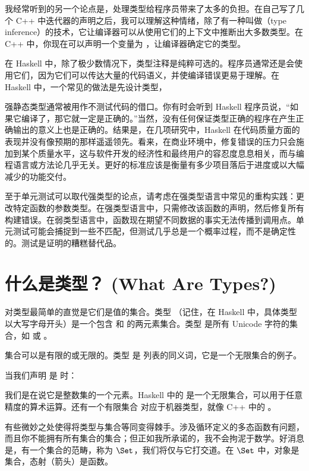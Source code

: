 我经常听到的另一个论点是，处理类型给程序员带来了太多的负担。在自己写了几个 C++ 中迭代器的声明之后，我可以理解这种情绪，除了有一种叫做（type inference）的技术，它让编译器可以从使用它们的上下文中推断出大多数类型。在 C++ 中，你现在可以声明一个变量为 ，让编译器确定它的类型。

在 Haskell 中，除了极少数情况下，类型注释是纯粹可选的。程序员通常还是会使用它们，因为它们可以传达大量的代码语义，并使编译错误更易于理解。在 Haskell 中，一个常见的做法是先设计类型，

强静态类型通常被用作不测试代码的借口。你有时会听到 Haskell 程序员说，“如果它编译了，那它就一定是正确的。”当然，没有任何保证类型正确的程序在产生正确输出的意义上也是正确的。结果是，在几项研究中，Haskell 在代码质量方面的表现并没有像预期的那样遥遥领先。看来，在商业环境中，修复错误的压力只会施加到某个质量水平，这与软件开发的经济性和最终用户的容忍度息息相关，而与编程语言或方法论几乎无关。更好的标准应该是衡量有多少项目落后于进度或以大幅减少的功能交付。

至于单元测试可以取代强类型的论点，请考虑在强类型语言中常见的重构实践：更改特定函数的参数类型。在强类型语言中，只需修改该函数的声明，然后修复所有构建错误。在弱类型语言中，函数现在期望不同数据的事实无法传播到调用点。单元测试可能会捕捉到一些不匹配，但测试几乎总是一个概率过程，而不是确定性的。测试是证明的糟糕替代品。

\section{什么是类型？ (What Are Types?)}

对类型最简单的直觉是它们是值的集合。类型 （记住，在 Haskell 中，具体类型以大写字母开头）是一个包含  和  的两元素集合。类型  是所有 Unicode 字符的集合，如  或 。

集合可以是有限的或无限的。类型  是  列表的同义词，它是一个无限集合的例子。

当我们声明  是  时：

我们是在说它是整数集的一个元素。Haskell 中的  是一个无限集合，可以用于任意精度的算术运算。还有一个有限集合  对应于机器类型，就像 C++ 中的 。

有些微妙之处使得将类型与集合等同变得棘手。涉及循环定义的多态函数有问题，而且你不能拥有所有集合的集合；但正如我所承诺的，我不会拘泥于数学。好消息是，有一个集合的范畴，称为 $\Set$，我们将仅与它打交道。在 $\Set$ 中，对象是集合，态射（箭头）是函数。

